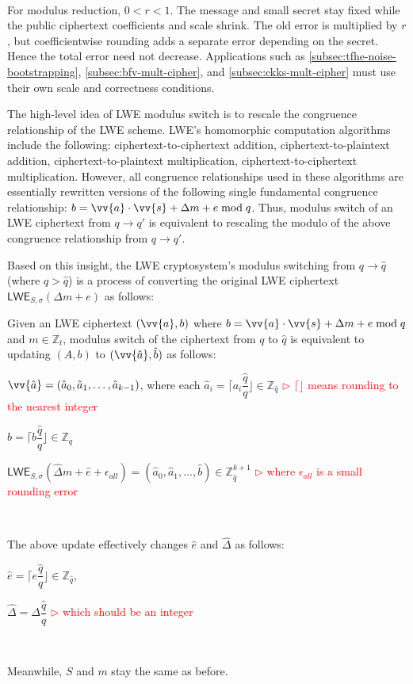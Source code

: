 $ $


For modulus reduction, $0<r<1$. The message and small secret stay fixed while the public ciphertext coefficients and scale shrink. The old error is multiplied by $r$, but coefficientwise rounding adds a separate error depending on the secret. Hence the total error need not decrease. Applications such as \autoref{subsec:tfhe-noise-bootstrapping}, \autoref{subsec:bfv-mult-cipher}, and \autoref{subsec:ckks-mult-cipher} must use their own scale and correctness conditions.

The high-level idea of LWE modulus switch is to rescale the congruence relationship of the LWE scheme. LWE's homomorphic computation algorithms include the following: ciphertext-to-ciphertext addition, ciphertext-to-plaintext addition, ciphertext-to-plaintext multiplication, ciphertext-to-ciphertext multiplication. However, all congruence relationships used in these algorithms are essentially rewritten versions of the following single fundamental congruence relationship: $b = \vv{a}\cdot \vv{s} + \Delta m + e \bmod q$. Thus, modulus switch of an LWE ciphertext from $q \rightarrow q'$ is equivalent to rescaling the modulo of the above congruence relationship from $q \rightarrow q'$.

Based on this insight, the LWE cryptosystem's modulus switching from $q \rightarrow \hat{q}$ (where $q > \hat{q}$) is a process of converting the original LWE ciphertext $\textsf{LWE}_{S, \sigma}(\Delta m + e)$ as follows:

\begin{tcolorbox}[title={\textbf{\tboxlabel{\ref*{subsec:modulus-switch-lwe}} LWE Modulus Switching}}]

Given an LWE ciphertext $(\vv{a}, b)$ where $b = \vv{a}\cdot \vv{s} + \Delta m + e \bmod q$ and $m \in \mathbb{Z}_t$, modulus switch of the ciphertext from $q$ to $\hat q$ is equivalent to updating $(A, b)$ to $(\vv{\hat{a}}, \hat b)$ as follows:


$\vv{\hat{a}} = (\hat{a}_0, \hat{a}_1, \ldots, \hat{a}_{k-1})$, where each $\hat{a}_i = \Big\lceil a_i\dfrac{\hat{q}}{q} \Big\rfloor \in \mathbb{Z}_{\hat{q}}$ \textcolor{red}{ $\rhd$ $\lceil \rfloor$ means rounding to the nearest integer}

 $\hat{b} = \Big\lceil b \dfrac{\hat{q}}{q} \Big\rfloor \in \mathbb{Z}_{\hat{q}}$

$\textsf{LWE}_{{S},\sigma}(\hat{\Delta}  m + \hat{e} + \epsilon_{\textit{all}}) = (\hat{a}_0, \hat{a}_1, \ldots, \hat{b}) \in \mathbb{Z}_{\hat{q}}^{k + 1}$  \textcolor{red}{ $\rhd$  where $\epsilon_{\textit{all}}$ is a small rounding error}

$ $


The above update effectively changes $\hat e$ and $\hat \Delta$ as follows:

$\hat{e} = \Big\lceil e\dfrac{\hat{q}}{q} \Big\rfloor \in \mathbb{Z}_{\hat{q}}$, \text{ }

$\hat{\Delta} = \Delta\dfrac{\hat{q}}{q}$ \textcolor{red}{ $\rhd$ which should be an integer}

$ $


Meanwhile, $S$ and $m$ stay the same as before.

\end{tcolorbox}

